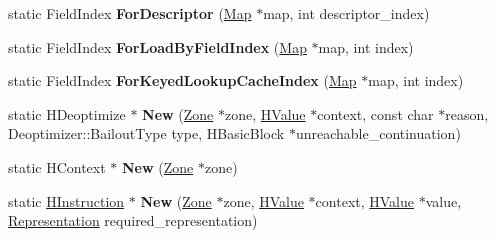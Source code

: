 \begin{DoxyCompactItemize}
\item 
\hypertarget{classv8_1_1internal_1_1_v8___f_i_n_a_l_ac5c2e0ac03b25f2ab4741e17178d498f}{}static Field\+Index {\bfseries For\+Descriptor} (\hyperlink{classv8_1_1internal_1_1_map}{Map} $\ast$map, int descriptor\+\_\+index)\label{classv8_1_1internal_1_1_v8___f_i_n_a_l_ac5c2e0ac03b25f2ab4741e17178d498f}

\item 
\hypertarget{classv8_1_1internal_1_1_v8___f_i_n_a_l_a44ff804120e6491eeaa2d3d27c97a633}{}static Field\+Index {\bfseries For\+Load\+By\+Field\+Index} (\hyperlink{classv8_1_1internal_1_1_map}{Map} $\ast$map, int index)\label{classv8_1_1internal_1_1_v8___f_i_n_a_l_a44ff804120e6491eeaa2d3d27c97a633}

\item 
\hypertarget{classv8_1_1internal_1_1_v8___f_i_n_a_l_a354f20ab6ee73f32ac5e61873c3fe3ea}{}static Field\+Index {\bfseries For\+Keyed\+Lookup\+Cache\+Index} (\hyperlink{classv8_1_1internal_1_1_map}{Map} $\ast$map, int index)\label{classv8_1_1internal_1_1_v8___f_i_n_a_l_a354f20ab6ee73f32ac5e61873c3fe3ea}

\item 
\hypertarget{classv8_1_1internal_1_1_v8___f_i_n_a_l_aac9308d81318fe56dec1629d8b8ae6da}{}static H\+Deoptimize $\ast$ {\bfseries New} (\hyperlink{classv8_1_1internal_1_1_zone}{Zone} $\ast$zone, \hyperlink{classv8_1_1internal_1_1_h_value}{H\+Value} $\ast$context, const char $\ast$reason, Deoptimizer\+::\+Bailout\+Type type, H\+Basic\+Block $\ast$unreachable\+\_\+continuation)\label{classv8_1_1internal_1_1_v8___f_i_n_a_l_aac9308d81318fe56dec1629d8b8ae6da}

\item 
\hypertarget{classv8_1_1internal_1_1_v8___f_i_n_a_l_a59bfa9cfcf2c4f97b91e66b6b71ae93f}{}static H\+Context $\ast$ {\bfseries New} (\hyperlink{classv8_1_1internal_1_1_zone}{Zone} $\ast$zone)\label{classv8_1_1internal_1_1_v8___f_i_n_a_l_a59bfa9cfcf2c4f97b91e66b6b71ae93f}

\item 
\hypertarget{classv8_1_1internal_1_1_v8___f_i_n_a_l_afac0a89d0e7b996b9b39df1f06dfd025}{}static \hyperlink{classv8_1_1internal_1_1_h_instruction}{H\+Instruction} $\ast$ {\bfseries New} (\hyperlink{classv8_1_1internal_1_1_zone}{Zone} $\ast$zone, \hyperlink{classv8_1_1internal_1_1_h_value}{H\+Value} $\ast$context, \hyperlink{classv8_1_1internal_1_1_h_value}{H\+Value} $\ast$value, \hyperlink{classv8_1_1internal_1_1_representation}{Representation} required\+\_\+representation)\label{classv8_1_1internal_1_1_v8___f_i_n_a_l_afac0a89d0e7b996b9b39df1f06dfd025}


\end{DoxyCompactItemize}
